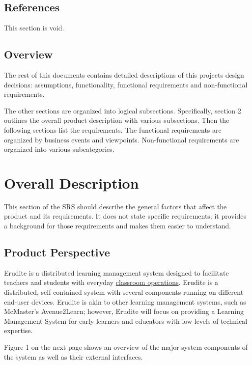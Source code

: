 \documentclass[]{article}
\begin{document}
\subsection{References}
\label{sub:references}
This section is void.


\subsection{Overview}
\label{sub:overview}
The rest of this documents contains detailed descriptions of this projects
design decisions: assumptions, functionality, functional requirements and
non-functional requirements.

The other sections are organized into logical subsections. Specifically, section
2 outlines the overall product description with various subsections. Then the
following sections list the requirements. The functional requirements are
organized by business events and viewpoints. Non-functional requirements are
organized into various subcategories.




\section{Overall Description}
\label{sec:overall_description}

This section of the SRS should describe the general factors that affect the
product and its requirements. It does not state specific requirements; it
provides a background for those requirements and makes them easier to
understand.

\subsection{Product Perspective}
\label{sub:product_perspective}
Erudite is a distributed learning management system designed to facilitate
teachers and students with everyday \underline{classroom operations}. Erudite is
a distributed, self-contained system with several components running on
different end-user devices. Erudite is akin to other learning management
systems, such as McMaster's Avenue2Learn; however, Erudite will focus on
providing a Learning Management System for early learners and educators with
low levels of technical expertise.

Figure 1 on the next page shows an overview of the major system components of
the system as well as their external interfaces.
\end{document}
